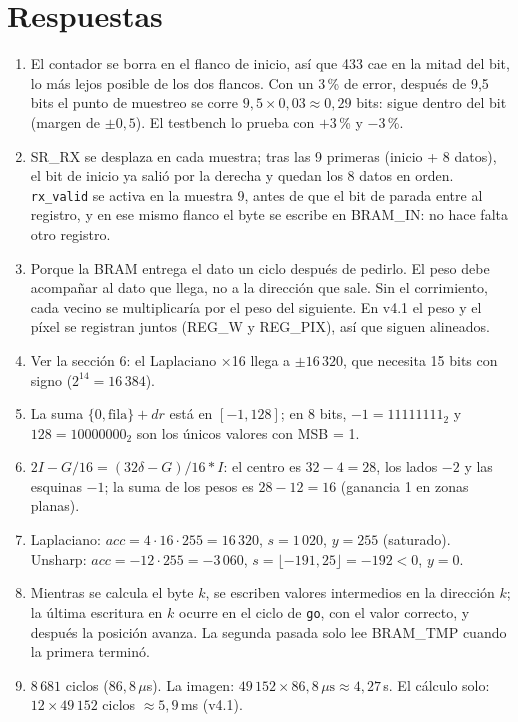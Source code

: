 \documentclass[11pt,a4paper]{article}
\newcommand{\sig}[1]{\texttt{\color{azul}#1}}
\begin{document}
\section{Respuestas}
\begin{enumerate}
\item El contador se borra en el flanco de inicio, así que 433 cae en la mitad del bit, lo más lejos posible de los dos flancos. Con un 3\,\% de error, después de 9,5 bits el punto de muestreo se corre $9{,}5 \times 0{,}03 \approx 0{,}29$ bits: sigue dentro del bit (margen de $\pm0{,}5$). El testbench lo prueba con $+3$\,\% y $-3$\,\%.
\item SR\_RX se desplaza en cada muestra; tras las 9 primeras (inicio + 8 datos), el bit de inicio ya salió por la derecha y quedan los 8 datos en orden. \sig{rx\_valid} se activa en la muestra 9, antes de que el bit de parada entre al registro, y en ese mismo flanco el byte se escribe en BRAM\_IN: no hace falta otro registro.
\item Porque la BRAM entrega el dato un ciclo después de pedirlo. El peso debe acompañar al dato que llega, no a la dirección que sale. Sin el corrimiento, cada vecino se multiplicaría por el peso del siguiente. En v4.1 el peso y el píxel se registran juntos (REG\_W y REG\_PIX), así que siguen alineados.
\item Ver la sección 6: el Laplaciano ×16 llega a $\pm16\,320$, que necesita 15 bits con signo ($2^{14} = 16\,384$).
\item La suma $\{0,\text{fila}\} + dr$ está en $[-1, 128]$; en 8 bits, $-1 = 11111111_2$ y $128 = 10000000_2$ son los únicos valores con MSB = 1.
\item $2I - G/16 = (32\delta - G)/16 * I$: el centro es $32 - 4 = 28$, los lados $-2$ y las esquinas $-1$; la suma de los pesos es $28 - 12 = 16$ (ganancia 1 en zonas planas).
\item Laplaciano: $acc = 4\cdot16\cdot255 = 16\,320$, $s = 1\,020$, $y = 255$ (saturado). Unsharp: $acc = -12\cdot255 = -3\,060$, $s = \lfloor -191{,}25 \rfloor = -192 < 0$, $y = 0$.
\item Mientras se calcula el byte $k$, se escriben valores intermedios en la dirección $k$; la última escritura en $k$ ocurre en el ciclo de \sig{go}, con el valor correcto, y después la posición avanza. La segunda pasada solo lee BRAM\_TMP cuando la primera terminó.
\item $8\,681$ ciclos ($86{,}8\,\mu$s). La imagen: $49\,152 \times 86{,}8\,\mu\text{s} \approx 4{,}27$\,s. El cálculo solo: $12 \times 49\,152$ ciclos $\approx 5{,}9$\,ms (v4.1).

\end{enumerate}
\end{document}
